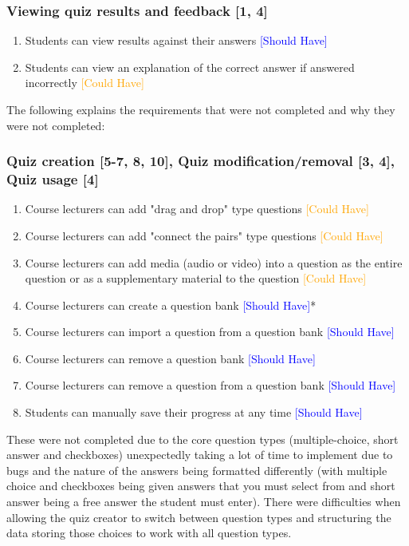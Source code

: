 \subsubsection{Viewing quiz results and feedback [1, 4]}
\begin{enumerate}
	\item Students can view results against their answers \textcolor{Blue}{[Should Have]}
	\item Students can view an explanation of the correct answer if answered incorrectly \textcolor{Orange}{[Could Have]}
\end{enumerate}

The following explains the requirements that were not completed and why they were not completed:

\subsubsection{Quiz creation [5-7, 8, 10], Quiz modification/removal [3, 4], Quiz usage [4]}
\begin{enumerate}
	\item Course lecturers can add "drag and drop" type questions \textcolor{Orange}{[Could Have]}
	\item Course lecturers can add "connect the pairs" type questions \textcolor{Orange}{[Could Have]}
	\item Course lecturers can add media (audio or video) into a question as the entire question or as a supplementary material to the question \textcolor{Orange}{[Could Have]}
	\item Course lecturers can create a question bank \textcolor{Blue}{[Should Have]}*
	\item Course lecturers can import a question from a question bank \textcolor{Blue}{[Should Have]}
	\item Course lecturers can remove a question bank \textcolor{Blue}{[Should Have]}
	\item Course lecturers can remove a question from a question bank \textcolor{Blue}{[Should Have]}
	\item Students can manually save their progress at any time \textcolor{Blue}{[Should Have]}
\end{enumerate}

These were not completed due to the core question types (multiple-choice, short answer and checkboxes) unexpectedly taking a lot of time to implement due to bugs and the nature of the answers being formatted differently (with multiple choice and checkboxes being given answers that you must select from and short answer being a free answer the student must enter). There were difficulties when allowing the quiz creator to switch between question types and structuring the data storing those choices to work with all question types. 

